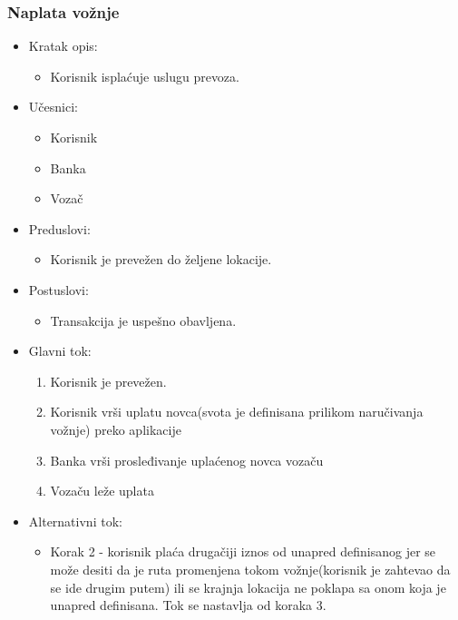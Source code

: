 \subsubsection{\bfseries Naplata vožnje}
\begin{itemize}
	\item Kratak opis:
		\begin{itemize}
			\item Korisnik isplaćuje uslugu prevoza.
		\end{itemize}
 
	\item Učesnici:
		\begin{itemize}
			\item Korisnik
			\item Banka
			\item Vozač
		\end{itemize}				

	\item Preduslovi:
		\begin{itemize}
		    \item Korisnik je prevežen do željene lokacije.
		\end{itemize}

	\item Postuslovi:
		\begin{itemize}
			\item Transakcija je uspešno obavljena.
		\end{itemize}		


	\item Glavni tok:
		\begin{enumerate}
		    \item Korisnik je prevežen.
		    \item Korisnik vrši uplatu novca(svota je definisana prilikom naručivanja vožnje) preko aplikacije
		    \item Banka vrši prosleđivanje uplaćenog novca vozaču
		    \item Vozaču leže uplata
		     
		\end{enumerate}

	\item Alternativni tok:
		\begin{itemize}
    		\item Korak 2 - korisnik plaća drugačiji iznos od unapred definisanog jer se može desiti da je ruta promenjena tokom vožnje(korisnik je zahtevao da se ide drugim putem) ili se krajnja lokacija ne poklapa sa onom koja je unapred definisana. Tok se nastavlja od koraka 3.
		\end{itemize}
\end{itemize}

